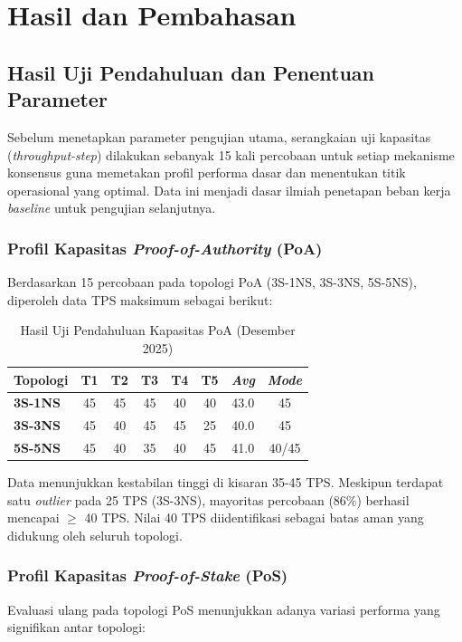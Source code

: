 \chapter{Hasil dan Pembahasan}

\section{Hasil Uji Pendahuluan dan Penentuan Parameter}

Sebelum menetapkan parameter pengujian utama, serangkaian uji kapasitas (\textit{throughput-step}) dilakukan sebanyak 15 kali percobaan untuk setiap mekanisme konsensus guna memetakan profil performa dasar dan menentukan titik operasional yang optimal. Data ini menjadi dasar ilmiah penetapan beban kerja \textit{baseline} untuk pengujian selanjutnya.

\subsection{Profil Kapasitas \textit{Proof-of-Authority} (PoA)}
Berdasarkan 15 percobaan pada topologi PoA (3S-1NS, 3S-3NS, 5S-5NS), diperoleh data TPS maksimum sebagai berikut:

\begin{table}[htbp]
\centering
\caption{Hasil Uji Pendahuluan Kapasitas PoA (Desember 2025)}
\label{tab:prelim_poa}
\begin{tabular}{|l|c|c|c|c|c|c|c|}
\hline
\textbf{Topologi} & \textbf{T1} & \textbf{T2} & \textbf{T3} & \textbf{T4} & \textbf{T5} & \textbf{\textit{Avg}} & \textbf{\textit{Mode}} \\ \hline
\textbf{3S-1NS} & 45 & 45 & 45 & 40 & 40 & 43.0 & 45 \\ \hline
\textbf{3S-3NS} & 45 & 40 & 45 & 45 & 25 & 40.0 & 45 \\ \hline
\textbf{5S-5NS} & 45 & 40 & 35 & 40 & 45 & 41.0 & 40/45 \\ \hline
\end{tabular}
\end{table}

Data menunjukkan kestabilan tinggi di kisaran 35-45 TPS. Meskipun terdapat satu \textit{outlier} pada 25 TPS (3S-3NS), mayoritas percobaan (86\%) berhasil mencapai $\ge$ 40 TPS. Nilai 40 TPS diidentifikasi sebagai batas aman yang didukung oleh seluruh topologi.

\subsection{Profil Kapasitas \textit{Proof-of-Stake} (PoS)}
Evaluasi ulang pada topologi PoS menunjukkan adanya variasi performa yang signifikan antar topologi:

